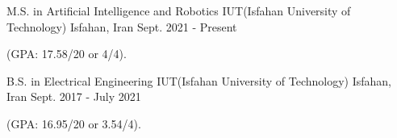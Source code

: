 

\begin{cventries}

    \cventry 
    {M.S. in Artificial Intelligence and Robotics} %
    {IUT(Isfahan University of Technology)} %
    {Isfahan, Iran} %
    {Sept. 2021 - Present} %
    {
      \begin{cvitems} %
        \item {(GPA: 17.58/20 or 4/4).}
      \end{cvitems}
    }
    \cventry
    {B.S. in Electrical Engineering } %
    {IUT(Isfahan University of Technology)} %
    {Isfahan, Iran} %
    {Sept. 2017 - July 2021} %
    {
      \begin{cvitems} %
        \item {(GPA: 16.95/20 or 3.54/4).}
      \end{cvitems}
    }

\end{cventries}
